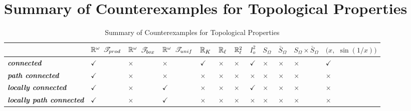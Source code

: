 \documentclass[11pt]{article}
\begin{document}
\newpage
\section{Summary of Counterexamples for Topological Properties}
\begin{table}[h!]
\setlength{\abovedisplayskip}{0pt}
\setlength{\belowdisplayskip}{-10pt}
\setlength{\abovedisplayshortskip}{0pt}
\setlength{\belowdisplayshortskip}{0pt}
\footnotesize
\centering
\caption{Summary of Counterexamples for Topological Properties}
\label{tab: counterexample}
\renewcommand\tabularxcolumn[1]{m{#1}}
\small
\begin{tabularx}{1\textwidth} { 
  | >{\raggedright\arraybackslash} m{2cm}
  | >{\centering\arraybackslash}X
  | >{\centering\arraybackslash}X
  | >{\centering\arraybackslash}X
  | >{\centering\arraybackslash}X
  | >{\centering\arraybackslash}X
  | >{\centering\arraybackslash}X
  | >{\centering\arraybackslash}X
  | >{\centering\arraybackslash}X
  | >{\centering\arraybackslash}X
  | >{\centering\arraybackslash}m{1.5cm}
  | >{\centering\arraybackslash}m{1.5cm}  | }
 \hline
  &  ${\mathbb R}^{\omega}$  ${\mathscr T}_{prod}$ &  ${\mathbb R}^{\omega}$  ${\mathscr T}_{box}$ &  ${\mathbb R}^{\omega}$  $ {\mathscr T}_{unif}$ &  ${\mathbb R}_{K}$  &  ${\mathbb R}_{\ell}$ & ${\mathbb R}_{\ell}^2$  & $I_o^2$  & $S_{\Omega}$ & $\bar{S}_{\Omega}$ & $S_{\Omega} \times \bar{S}_{\Omega}$ & $(x,$ $\sin(1/x))$\\
  \hline \vspace{5pt}
\emph{\textbf{connected}}  \vspace{2pt} & $\checkmark$ & $\times$ & $\times$  & $\checkmark$ & $\times$ & $\times$ & $\checkmark$ &  $\times$ & $\times$ &  $\times$ &  $\checkmark$  \\
\hline \vspace{5pt}
\emph{\textbf{path connected}}  \vspace{2pt} & $\checkmark$ & $\times$ &  $\times$ & $\times$ & $\times$ & $\times$ & $\times$ & $\times$ &$\times$  & $\times$ &  $\times$ \\
\hline \vspace{5pt}
\emph{\textbf{locally connected}}  \vspace{2pt} &  $\checkmark$ &  $\times$  &  $\checkmark$ & $\times$ & $\times$ &  $\times$ & $\checkmark$ & $\times$ &$\times$  &  $\times$ &  $\times$ \\
\hline \vspace{5pt}
\emph{\textbf{locally path connected}}  \vspace{2pt} &  $\checkmark$ &  $\times$  &  $\checkmark$ &$\times$ & $\times$ & $\times$ & $\times$ & $\times$ & $\times$ &$\times$ &  $\times$ \\

\end{tabularx}
\end{table}
\end{document}
